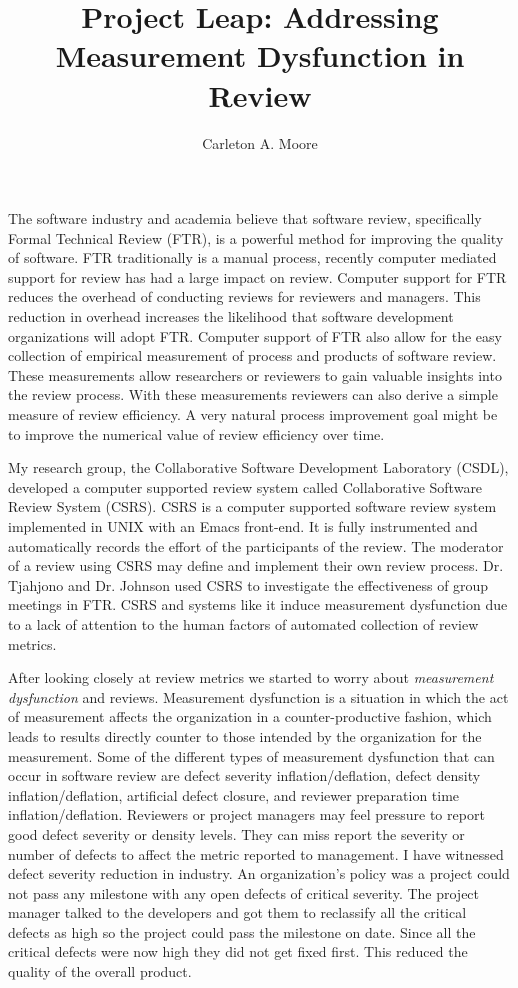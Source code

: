 \documentclass[12pt]{article}
\begin{document}
\title{Project Leap: Addressing Measurement Dysfunction in Review}
\author{Carleton A. Moore}
\maketitle

The software industry and academia believe that software review,
specifically Formal Technical Review (FTR), is a powerful method for
improving the quality of software.  FTR traditionally is a manual process,
recently computer mediated support for review has had a large impact on
review.  Computer support for FTR reduces the overhead of conducting
reviews for reviewers and managers.  This reduction in overhead increases
the likelihood that software development organizations will adopt FTR.
Computer support of FTR also allow for the easy collection of empirical
measurement of process and products of software review.  These measurements
allow researchers or reviewers to gain valuable insights into the review
process.  With these measurements reviewers can also derive a simple
measure of review efficiency.  A very natural process improvement goal
might be to improve the numerical value of review efficiency over time.

My research group, the Collaborative Software Development Laboratory
(CSDL), developed a computer supported review system called Collaborative
Software Review System (CSRS)\cite{csdl-95-08}. CSRS is a computer
supported software review system implemented in UNIX with an Emacs
front-end.  It is fully instrumented and automatically records the effort
of the participants of the review.  The moderator of a review using CSRS
may define and implement their own review process.  Dr. Tjahjono and Dr.
Johnson used CSRS to investigate the effectiveness of group meetings in
FTR\cite{csdl-96-14}.  CSRS and systems like it induce measurement
dysfunction due to a lack of attention to the human factors of automated
collection of review metrics.

After looking closely at review metrics we started to worry about {\em
  measurement dysfunction\cite{Austin96}} and reviews.  Measurement
dysfunction is a situation in which the act of measurement affects the
organization in a counter-productive fashion, which leads to results
directly counter to those intended by the organization for the measurement.
Some of the different types of measurement dysfunction that can occur in
software review are defect severity inflation/deflation, defect density
inflation/deflation, artificial defect closure, and reviewer preparation
time inflation/deflation\cite{csdl-96-16}.  Reviewers or project managers
may feel pressure to report good defect severity or density levels.  They
can miss report the severity or number of defects to affect the metric
reported to management.  I have witnessed defect severity reduction in
industry.  An organization's policy was a project could not pass any
milestone with any open defects of critical severity.  The project manager
talked to the developers and got them to reclassify all the critical
defects as high so the project could pass the milestone on date.  Since all
the critical defects were now high they did not get fixed first.  This
reduced the quality of the overall product.
\end{document}
